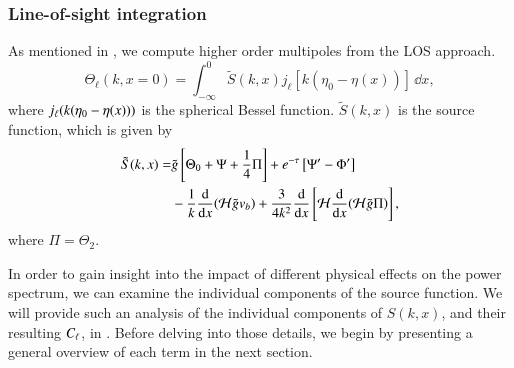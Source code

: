 \subsubsection{Line-of-sight integration}\label{sssec:M4:theory:line_of_sight_integration}
As mentioned in , we compute higher order multipoles from the LOS approach. 
\begin{equation} \label{eq:M4:theory:Theta_ell_LOS_integration}
    \Theta_\ell(k,x=0) = \int_{-\infty}^0 \tilde{S}(k,x) j_\ell [k(\eta_0 - \eta(x))]\,\dd x, 
\end{equation}
where $j_\ell(k(\eta_0-\eta(x)))$ is the spherical Bessel function. $\tilde{S}(k,x)$ is the source function, which is given by 
\begin{equation} \label{eq:M4:theory:source_function_LOS}
    \begin{split}
        \tilde{S}(k,x) =& \tilde{g} \left[ \Theta_0 + \Psi + \frac{1}{4} \Pi \right] + e^{-\tau}\left[ \Psi' - \Phi' \right] \\
        & - \frac{1}{k}\dv{x}(\mathcal{H} \tilde{g} v_b) + \frac{3}{4k^2}\dv{x}\left[ \mathcal{H} \dv{x}(\mathcal{H}\tilde{g}\Pi) \right],
    \end{split}
\end{equation}
where $\Pi=\Theta_2$.

In order to gain insight into the impact of different physical effects on the power spectrum, we can examine the individual components of the source function. We will provide such an analysis of the individual components of $S(k,x)$, and their resulting $C_\ell$, in . Before delving into those details, we begin by presenting a general overview of each term in the next section.

